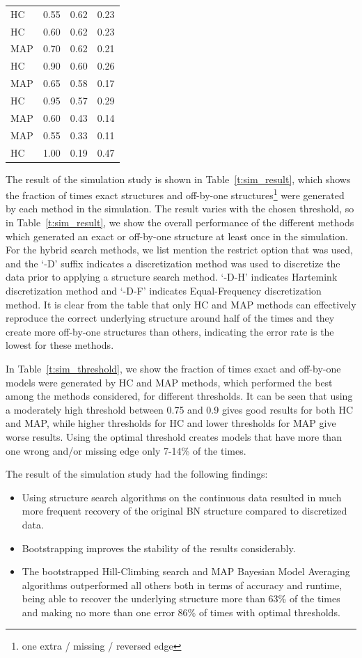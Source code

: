 \documentclass[smallextended]{svjour3}       %
\begin{document}
\begin{table}
{{\begin{tabular}{llll}
HC & 0.55 & 0.62 & 0.23 \\
HC & 0.60 & 0.62 & 0.23 \\
MAP & 0.70 & 0.62 & 0.21 \\
HC & 0.90 & 0.60 & 0.26 \\
MAP & 0.65 & 0.58 & 0.17 \\
HC & 0.95 & 0.57 & 0.29 \\
MAP & 0.60 & 0.43 & 0.14 \\
MAP & 0.55 & 0.33 & 0.11 \\
HC & 1.00 & 0.19 & 0.47\\ \hline
\end{tabular}
}}
\vspace{-10pt}
\end{table}

The result of the simulation study is shown in Table~\ref{t:sim_result}, which shows 
the fraction of times exact structures and off-by-one structures\footnote{one extra 
/ missing / reversed edge} were generated by each method in the simulation. The result varies 
with the chosen threshold, so in Table~\ref{t:sim_result}, we show the overall performance of the
different methods  which generated an exact or off-by-one structure at least once in the simulation.
For the hybrid search methods, we list mention the restrict option that was used, and the 
`-D' suffix indicates a discretization method was used to discretize the data prior to applying 
a structure search method. `-D-H' indicates Hartemink discretization method and `-D-F' indicates 
Equal-Frequency discretization method. It is clear from the table that only HC and MAP methods
can effectively reproduce the correct underlying structure around half of the times and they create 
more off-by-one structures than others, indicating the error rate is the lowest for these methods.


In Table~\ref{t:sim_threshold}, we show the fraction of times exact and 
off-by-one models were generated by HC and MAP methods, which performed 
the best among the methods considered,  for different thresholds. 
It can be seen that using a moderately high threshold between 0.75 and 0.9 gives
good results for both HC and MAP, while higher thresholds for HC and lower thresholds for MAP
give worse results. Using the optimal threshold creates models that have more than one wrong 
and/or missing edge only 7-14\% of the times. 

The result of the simulation study had the following findings:
\begin{itemize}
\item Using structure search algorithms on the continuous data resulted in much more frequent recovery of the original BN structure compared to discretized data.
\item Bootstrapping  improves the stability of the results considerably.
\item The bootstrapped Hill-Climbing search and MAP Bayesian Model Averaging algorithms outperformed all others both in terms of accuracy and runtime, being able to recover the underlying structure more than 63\% of the times and making no more than one error 86\% of times with optimal thresholds. 
\end{itemize}
\end{document}
